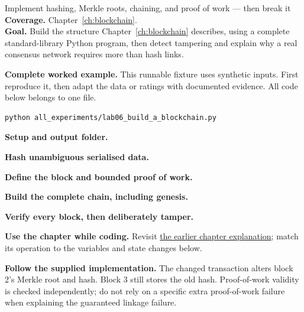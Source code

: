 
\begin{labproject}{Implement hashing, Merkle roots, chaining, and proof of work --- then break it}
\textbf{Coverage.} Chapter~\ref{ch:blockchain}.\\
\textbf{Goal.} Build the structure Chapter~\ref{ch:blockchain} describes, using a complete standard-library Python program, then detect tampering and explain why a real consensus network requires more than hash links.




\end{labproject}

\textbf{Complete worked example.} This runnable fixture uses synthetic inputs. First reproduce it, then adapt the data or ratings with documented evidence. All code below belongs to one file.
\begin{lstlisting}[style=utpterminal]
python all_experiments/lab06_build_a_blockchain.py
\end{lstlisting}

\noindent\textbf{Setup and output folder.}


\noindent\textbf{Hash unambiguous serialised data.}


\noindent\textbf{Define the block and bounded proof of work.}



\noindent\textbf{Build the complete chain, including genesis.}


\noindent\textbf{Verify every block, then deliberately tamper.}


\textbf{Use the chapter while coding.} Revisit \hyperref[ch:blockchain]{the earlier chapter explanation}; match its operation to the variables and state changes below.

\textbf{Follow the supplied implementation.} The changed transaction alters block 2's Merkle root and hash. Block 3 still stores the old hash. Proof-of-work validity is checked independently; do not rely on a specific extra proof-of-work failure when explaining the guaranteed linkage failure.


